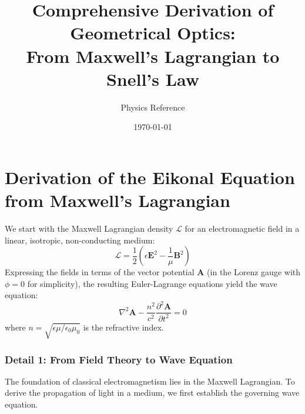 \documentclass[12pt,a4paper]{article}
\title{Comprehensive Derivation of Geometrical Optics: \\ From Maxwell's Lagrangian to Snell's Law}
\author{Physics Reference}
\date{\today}
\begin{document}
\maketitle

\section{Derivation of the Eikonal Equation from Maxwell's Lagrangian}
We start with the Maxwell Lagrangian density $\mathcal{L}$ for an electromagnetic field in a linear, isotropic, non-conducting medium:
\begin{equation}
\mathcal{L} = \frac{1}{2} \left( \epsilon \mathbf{E}^2 - \frac{1}{\mu} \mathbf{B}^2 \right)
\end{equation}
Expressing the fields in terms of the vector potential $\mathbf{A}$ (in the Lorenz gauge with $\phi=0$ for simplicity), the resulting Euler-Lagrange equations yield the wave equation:
\begin{equation}
\nabla^2 \mathbf{A} - \frac{n^2}{c^2} \frac{\partial^2 \mathbf{A}}{\partial t^2} = 0
\end{equation}
where $n = \sqrt{\epsilon \mu / \epsilon_0 \mu_0}$ is the refractive index.




\subsubsection{Detail 1: From Field Theory to Wave Equation}
The foundation of classical electromagnetism lies in the Maxwell Lagrangian. To derive the propagation of light in a medium, we first establish the governing wave equation.
\end{document}
